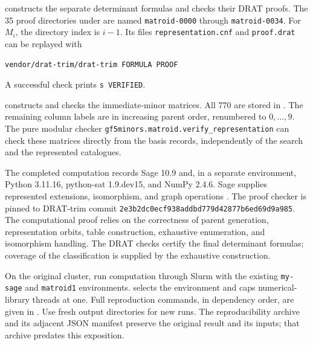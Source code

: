 \documentclass[11pt,a4paper]{article}
\theoremstyle{definition}
\begin{document}
 constructs the
separate determinant formulas and checks their DRAT proofs.
The 35 proof directories under
 are named
\texttt{matroid-0000} through \texttt{matroid-0034}. For $M_i$,
the directory index is $i-1$. Its files
\texttt{representation.cnf} and \texttt{proof.drat} can be
replayed with
\begin{verbatim}
vendor/drat-trim/drat-trim FORMULA PROOF
\end{verbatim}
A successful check prints \texttt{s VERIFIED}.

 constructs and checks the
immediate-minor matrices. All 770 are stored in
.
The remaining column labels are in increasing parent order,
renumbered to $0,\ldots,9$. The pure modular checker
\texttt{gf5minors.matroid.verify\_representation} can check
these matrices directly from the basis records, independently
of the search and the represented catalogues.

The completed computation records Sage 10.9 and, in a separate
environment, Python 3.11.16, python-sat 1.9.dev15, and NumPy
2.4.6. Sage supplies represented extensions, isomorphism,
and graph operations \cite{sage}. The proof checker is pinned
to DRAT-trim commit
\texttt{2e3b2dc0ecf938addbd779d42877b6ed69d9a985}.
The computational proof relies on the correctness of parent
generation, representation orbits, table construction,
exhaustive enumeration, and isomorphism handling. The DRAT
checks certify the final determinant formulas; coverage of the
classification is supplied by the exhaustive construction.

On the original cluster, run computation through Slurm with
the existing \texttt{my-sage} and \texttt{matroid1}
environments.  selects the environment
and caps numerical-library threads at one. Full reproduction
commands, in dependency order, are given in
. Use fresh output directories for new
runs. The reproducibility archive
 and its adjacent
JSON manifest preserve the original result and its inputs;
that archive predates this exposition.
\end{document}
